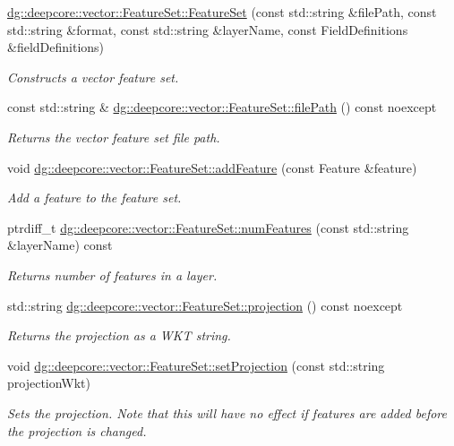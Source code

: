 \begin{DoxyCompactItemize}
\hyperlink{group___vector_module_gad9d6de87ab5e9557f542c0691ca088e0}{dg\+::deepcore\+::vector\+::\+Feature\+Set\+::\+Feature\+Set} (const std\+::string \&file\+Path, const std\+::string \&format, const std\+::string \&layer\+Name, const Field\+Definitions \&field\+Definitions)
\begin{DoxyCompactList}\small\item\em Constructs a vector feature set. \end{DoxyCompactList}\item 
const std\+::string \& \hyperlink{group___vector_module_ga438beae23c8c7333e1763addeb99b286}{dg\+::deepcore\+::vector\+::\+Feature\+Set\+::file\+Path} () const noexcept
\begin{DoxyCompactList}\small\item\em Returns the vector feature set file path. \end{DoxyCompactList}\item 
void \hyperlink{group___vector_module_ga9117c49056efd1ac51c2bb74043b50d6}{dg\+::deepcore\+::vector\+::\+Feature\+Set\+::add\+Feature} (const Feature \&feature)
\begin{DoxyCompactList}\small\item\em Add a feature to the feature set. \end{DoxyCompactList}\item 
ptrdiff\+\_\+t \hyperlink{group___vector_module_ga6ea15b282c93cedd1ddc676f1146e967}{dg\+::deepcore\+::vector\+::\+Feature\+Set\+::num\+Features} (const std\+::string \&layer\+Name) const 
\begin{DoxyCompactList}\small\item\em Returns number of features in a layer. \end{DoxyCompactList}\item 
std\+::string \hyperlink{group___vector_module_ga6067c0ad1fc35879804d30756d6af8d8}{dg\+::deepcore\+::vector\+::\+Feature\+Set\+::projection} () const noexcept
\begin{DoxyCompactList}\small\item\em Returns the projection as a W\+KT string. \end{DoxyCompactList}\item 
void \hyperlink{group___vector_module_gab665679d2cea8d9b0c324fd52410e181}{dg\+::deepcore\+::vector\+::\+Feature\+Set\+::set\+Projection} (const std\+::string projection\+Wkt)
\begin{DoxyCompactList}\small\item\em Sets the projection. Note that this will have no effect if features are added before the projection is changed. \end{DoxyCompactList}\item 

\end{DoxyCompactItemize}
